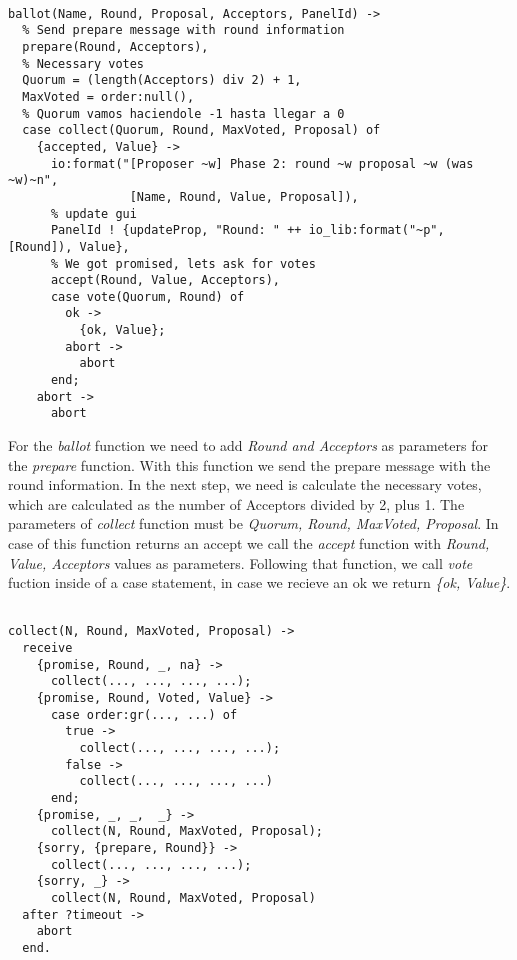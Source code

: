 \documentclass[a4paper, 10pt]{article}
\begin{document}
\begin{lstlisting}
  
ballot(Name, Round, Proposal, Acceptors, PanelId) ->
  % Send prepare message with round information
  prepare(Round, Acceptors),
  % Necessary votes
  Quorum = (length(Acceptors) div 2) + 1,
  MaxVoted = order:null(),
  % Quorum vamos haciendole -1 hasta llegar a 0
  case collect(Quorum, Round, MaxVoted, Proposal) of
    {accepted, Value} ->
      io:format("[Proposer ~w] Phase 2: round ~w proposal ~w (was ~w)~n", 
                 [Name, Round, Value, Proposal]),
      % update gui
      PanelId ! {updateProp, "Round: " ++ io_lib:format("~p", [Round]), Value},
      % We got promised, lets ask for votes
      accept(Round, Value, Acceptors),
      case vote(Quorum, Round) of
        ok ->
          {ok, Value};
        abort ->
          abort
      end;
    abort ->
      abort
\end{lstlisting}

For the \textit{ballot} function we need to add \textit{Round and Acceptors} as parameters for the \textit{prepare} function. With this function we send the prepare message with the round information. In the next step, we need is calculate the necessary votes, which are calculated as the number of Acceptors divided by 2, plus 1. The parameters of \textit{collect} function must be \textit{Quorum, Round, MaxVoted, Proposal}. In case of this function returns an accept we call the \textit{accept} function with \textit{Round, Value, Acceptors} values as parameters. Following that function, we call \textit{vote} fuction inside of a case statement, in case we recieve an ok we return \textit{\{ok, Value\}}.

\begin{lstlisting}
  
collect(N, Round, MaxVoted, Proposal) ->
  receive 
    {promise, Round, _, na} ->
      collect(..., ..., ..., ...);
    {promise, Round, Voted, Value} ->
      case order:gr(..., ...) of
        true ->
          collect(..., ..., ..., ...);
        false ->
          collect(..., ..., ..., ...)
      end;
    {promise, _, _,  _} ->
      collect(N, Round, MaxVoted, Proposal);
    {sorry, {prepare, Round}} ->
      collect(..., ..., ..., ...);
    {sorry, _} ->
      collect(N, Round, MaxVoted, Proposal)
  after ?timeout ->
    abort
  end.
\end{lstlisting}
\end{document}
